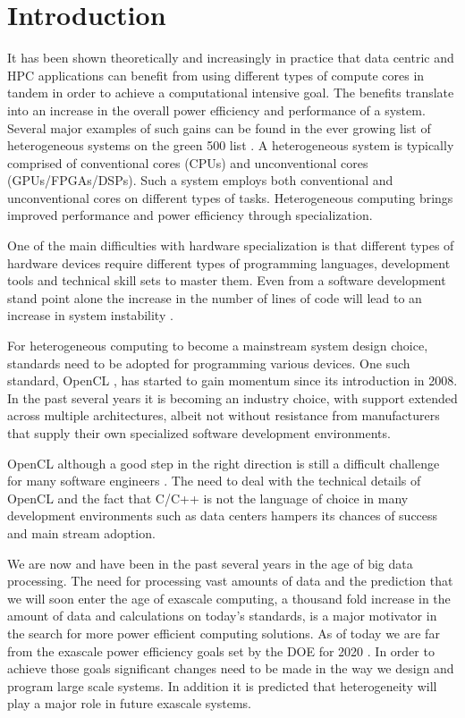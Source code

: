 \documentclass[runningheads,a4paper]{llncs}
\begin{document}
\section{Introduction}
It has been shown theoretically \cite{Chung:2010, Huang:2009} and increasingly in practice that data centric \cite{Chalamalasetti:2012} and HPC \cite{Gan:2013} applications can benefit from using different types of compute cores in tandem in order to achieve a computational intensive goal. The benefits translate into an increase in the overall power efficiency and performance of a system. Several major examples of such gains can be found in the ever growing list of heterogeneous systems on the green 500 list \cite{green500:2014}. A heterogeneous system is typically comprised of conventional cores (CPUs) and unconventional cores (GPUs/FPGAs/DSPs). Such a system employs both conventional and unconventional cores on different types of tasks. Heterogeneous computing brings improved performance and power efficiency through specialization.

One of the main difficulties with hardware specialization is that different types of hardware devices require different types of programming languages, development tools and technical skill sets to master them. Even from a software development stand point alone the increase in the number of lines of code will lead to an increase in system instability \cite{McConnell:1993}.

For heterogeneous computing to become a mainstream system design choice, standards need to be adopted for programming various devices. One such standard, OpenCL \cite{opencl:2011}, has started to gain momentum since its introduction in 2008. In the past several years it is becoming an industry choice, with support extended across multiple architectures, albeit not without resistance from manufacturers that supply their own specialized software development environments.

OpenCL although a good step in the right direction is still a difficult challenge for many software engineers \cite{tiode:2015}. The need to deal with the technical details of OpenCL and the fact that C/C++ is not the language of choice in many development environments such as data centers hampers its chances of success and main stream adoption.

We are now and have been in the past several years in the age of big data processing. The need for processing vast amounts of data and the prediction that we will soon enter the age of exascale computing, a thousand fold increase in the amount of data and calculations on today’s standards, is a major motivator in the search for more power efficient computing solutions. As of today we are far from the exascale power efficiency goals set by the DOE for 2020 \cite{Shalf:2010}. In order to achieve those goals significant changes need to be made in the way we design and program large scale systems. In addition it is predicted \cite{Dongarra:2011} that heterogeneity will play a major role in future exascale systems.
\end{document}
